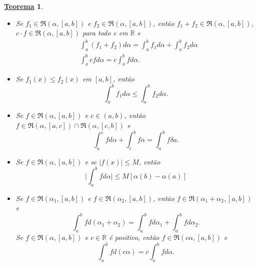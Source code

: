 \documentclass{article}
\newtheorem*{theorem*}{\underline{Teorema}}
\begin{document}
\begin{theorem*}
 \begin{itemize}
   \item[a)] Se \(f_1\in \mathfrak{R}(\alpha , [a, b])\) e \(f_2\in \mathfrak{R}(\alpha , [a, b])\), então \(f_1 + f_2\in \mathfrak{R}(\alpha , [a, b])\), 
 \(c \cdot f\in \mathfrak{R}(\alpha , [a, b])\) para todo c em \(\mathbb{R}\) e 
\begin{align*}
  &\int_{a}^{b} (f_1 + f_2)d\alpha = \int_{a}^{b}f_1d\alpha + \int_{a}^{b}f_2d\alpha \\
  &\int_{a}^{b}cfd\alpha = c \int_{a}^{b}fd\alpha .
\end{align*}
\item[b)] Se \(f_{1}(x)\leq f_{2}(x)\) em \([a, b]\), então 
  \[
    \int_{a}^{b}f_{1}d\alpha \leq \int_{a}^{b}f_{2}d\alpha .
  \]
\item[c)] Se \(f\in \mathfrak{R}(\alpha , [a, b])\) e \(c\in (a, b)\), então \(f\in \mathfrak{R}(\alpha , [a, c])\cap \mathfrak{R}(\alpha ,[c, b])\) e 
  \[
    \int_{a}^{c}fd\alpha + \int_{c}^{b}f\alpha  = \int_{a}^{b}f\delta a.
  \]
  \item[d)] Se \(f\in \mathfrak{R}(\alpha , [a, b])\) e se \(|f(x)|\leq M\), então 
    \[
      \biggl\vert \int_{a}^{b}fd\alpha  \biggr\vert \leq  M[\alpha (b) - \alpha (a)]
    \]
  \item[e)] Se \(f\in \mathfrak{R}(\alpha_1, [a, b])\) e \(f\in \mathfrak{R}(\alpha _2, [a, b])\), então \(f\in \mathfrak{R}(\alpha _1 + \alpha _2, [a, b])\) e 
    \[
      \int_{a}^{b}fd(\alpha_1 + \alpha_2) = \int_{a}^{b}fd\alpha _1 + \int_{a}^{b}fd\alpha _2.
    \]
    Se \(f\in \mathfrak{R}(\alpha , [a,b])\) e \(c\in \mathbb{R}\) é positivo, então \(f\in \mathfrak{R}(c\alpha, [a, b] )\) e 
      \[
        \int_{a}^{b}fd(c\alpha) = c \int_{a}^{b}fd\alpha .
      \]
 \end{itemize}
\end{theorem*}
\end{document}
